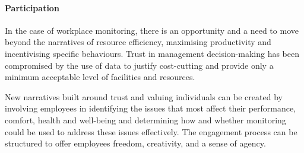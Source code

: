 \paragraph{Participation} In the case of workplace monitoring, there
is an opportunity and a need to move beyond the narratives of resource
efficiency, maximising productivity and incentivising specific
behaviours. Trust in management decision-making has been compromised
by the use of data to justify cost-cutting and provide only a minimum
acceptable level of facilities and resources. 


New narratives built around trust and valuing individuals can be
created by involving employees in identifying the issues that most
affect their performance, comfort, health and well-being and
determining how and whether monitoring could be used to address these
issues effectively. The engagement process can be structured to offer
employees freedom, creativity, and a sense of agency. 



